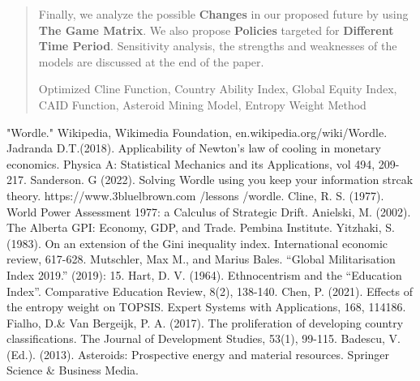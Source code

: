 \documentclass{mcmthesis}
\begin{document}
\begin{abstract}
Finally, we analyze the possible \textbf{Changes} in our proposed future by using \textbf{The Game Matrix}. We also propose \textbf{Policies} targeted for \textbf{Different Time Period}. Sensitivity analysis, the strengths and weaknesses of the models are discussed at the end of the paper.

	\begin{keywords}
		\footnotesize
Optimized Cline Function, Country Ability Index, Global Equity Index, CAID Function, Asteroid Mining Model, Entropy Weight Method
	\end{keywords}
\end{abstract}
\maketitle

\begin{spacing}{0.05}
	\tableofcontents
\end{spacing}
\clearpage
\normalsize










\begin{thebibliography}{99}
     "Wordle." Wikipedia, Wikimedia Foundation,  en.wikipedia.org/wiki/Wordle. 
     Jadranda D.T.(2018). Applicability of Newton’s law of cooling in monetary economics. Physica A: Statistical Mechanics and its Applications, vol 494, 209-217.
	 Sanderson. G (2022). Solving Wordle using you keep your information strcak theory. https://www.3bluelbrown.com /lessons /wordle.
	 Cline, R. S. (1977). World Power Assessment 1977: a Calculus of Strategic Drift.
	 Anielski, M. (2002). The Alberta GPI: Economy, GDP, and Trade. Pembina Institute.
	 Yitzhaki, S. (1983). On an extension of the Gini inequality index. International economic review, 617-628.
	 Mutschler, Max M., and Marius Bales. ``Global Militarisation Index 2019.'' (2019): 15.
	 Hart, D. V. (1964). Ethnocentrism and the ``Education Index''. Comparative Education Review, 8(2), 138-140.
	 Chen, P. (2021). Effects of the entropy weight on TOPSIS. Expert Systems with Applications, 168, 114186.
	 Fialho, D.\& Van Bergeijk, P. A. (2017). The proliferation of developing country classifications. The Journal of Development Studies, 53(1), 99-115.
	 Badescu, V. (Ed.). (2013). Asteroids: Prospective energy and material resources. Springer Science \& Business Media.

\end{thebibliography}
\end{document}
